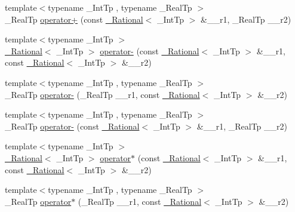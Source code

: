 \begin{DoxyCompactItemize}
\item 
{\footnotesize template$<$typename \+\_\+\+Int\+Tp , typename \+\_\+\+Real\+Tp $>$ }\\\+\_\+\+Real\+Tp \hyperlink{namespace____gnu__cxx_a5128562c48e4ec118f5b6947159bf3eb}{operator+} (const \hyperlink{class____gnu__cxx_1_1__Rational}{\+\_\+\+Rational}$<$ \+\_\+\+Int\+Tp $>$ \&\+\_\+\+\_\+r1, \+\_\+\+Real\+Tp \+\_\+\+\_\+r2)
\item 
{\footnotesize template$<$typename \+\_\+\+Int\+Tp $>$ }\\\hyperlink{class____gnu__cxx_1_1__Rational}{\+\_\+\+Rational}$<$ \+\_\+\+Int\+Tp $>$ \hyperlink{namespace____gnu__cxx_a9673a1f36bec838a08869eb91f2956ba}{operator-\/} (const \hyperlink{class____gnu__cxx_1_1__Rational}{\+\_\+\+Rational}$<$ \+\_\+\+Int\+Tp $>$ \&\+\_\+\+\_\+r1, const \hyperlink{class____gnu__cxx_1_1__Rational}{\+\_\+\+Rational}$<$ \+\_\+\+Int\+Tp $>$ \&\+\_\+\+\_\+r2)
\item 
{\footnotesize template$<$typename \+\_\+\+Int\+Tp , typename \+\_\+\+Real\+Tp $>$ }\\\+\_\+\+Real\+Tp \hyperlink{namespace____gnu__cxx_a3dd5bda728b924db9cd825b6cf94696a}{operator-\/} (\+\_\+\+Real\+Tp \+\_\+\+\_\+r1, const \hyperlink{class____gnu__cxx_1_1__Rational}{\+\_\+\+Rational}$<$ \+\_\+\+Int\+Tp $>$ \&\+\_\+\+\_\+r2)
\item 
{\footnotesize template$<$typename \+\_\+\+Int\+Tp , typename \+\_\+\+Real\+Tp $>$ }\\\+\_\+\+Real\+Tp \hyperlink{namespace____gnu__cxx_a8da73d2b1445a4c343f126dde3f28013}{operator-\/} (const \hyperlink{class____gnu__cxx_1_1__Rational}{\+\_\+\+Rational}$<$ \+\_\+\+Int\+Tp $>$ \&\+\_\+\+\_\+r1, \+\_\+\+Real\+Tp \+\_\+\+\_\+r2)
\item 
{\footnotesize template$<$typename \+\_\+\+Int\+Tp $>$ }\\\hyperlink{class____gnu__cxx_1_1__Rational}{\+\_\+\+Rational}$<$ \+\_\+\+Int\+Tp $>$ \hyperlink{namespace____gnu__cxx_ab5a882f1c1b6e31c999e472832a9cdb2}{operator$\ast$} (const \hyperlink{class____gnu__cxx_1_1__Rational}{\+\_\+\+Rational}$<$ \+\_\+\+Int\+Tp $>$ \&\+\_\+\+\_\+r1, const \hyperlink{class____gnu__cxx_1_1__Rational}{\+\_\+\+Rational}$<$ \+\_\+\+Int\+Tp $>$ \&\+\_\+\+\_\+r2)
\item 
{\footnotesize template$<$typename \+\_\+\+Int\+Tp , typename \+\_\+\+Real\+Tp $>$ }\\\+\_\+\+Real\+Tp \hyperlink{namespace____gnu__cxx_abefdb068557b930d6cb4a8457d24a163}{operator$\ast$} (\+\_\+\+Real\+Tp \+\_\+\+\_\+r1, const \hyperlink{class____gnu__cxx_1_1__Rational}{\+\_\+\+Rational}$<$ \+\_\+\+Int\+Tp $>$ \&\+\_\+\+\_\+r2)

\end{DoxyCompactItemize}
